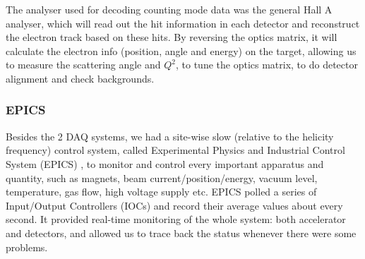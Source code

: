 The analyser used for decoding counting mode data was the general Hall A analyser,
which will read out the hit information in each detector and reconstruct the 
electron track based on these hits. By reversing the optics matrix, it will
calculate the electron info (position, angle and energy) on the target, allowing
us to measure the scattering angle and $Q^2$, to tune the optics matrix, 
to do detector alignment and check backgrounds.

\subsubsection{EPICS}
Besides the 2 DAQ systems, we had a site-wise slow (relative to the helicity frequency) 
control system, called Experimental Physics and Industrial Control System (EPICS) \cite{EPICS},
to monitor and control every important apparatus and quantity, such as magnets, 
beam current/position/energy, vacuum level, temperature, gas flow, 
high voltage supply etc. EPICS polled a series of 
Input/Output Controllers (IOCs) and record their average values about every second.
It provided real-time monitoring of the whole system: both accelerator and detectors, and
allowed us to trace back the status whenever there were some problems.

